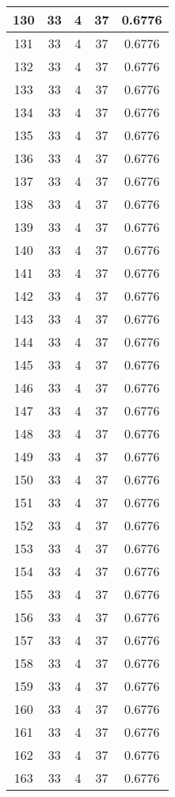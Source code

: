 \documentclass[letterpaper, 12pt]{article}
\begin{document}
\begin{longtable}{|c|c|c|c|c|}
\hline
130 & 33 & 4 & 37 & 0.6776 \\
\hline
131 & 33 & 4 & 37 & 0.6776 \\
\hline
132 & 33 & 4 & 37 & 0.6776 \\
\hline
133 & 33 & 4 & 37 & 0.6776 \\
\hline
134 & 33 & 4 & 37 & 0.6776 \\
\hline
135 & 33 & 4 & 37 & 0.6776 \\
\hline
136 & 33 & 4 & 37 & 0.6776 \\
\hline
137 & 33 & 4 & 37 & 0.6776 \\
\hline
138 & 33 & 4 & 37 & 0.6776 \\
\hline
139 & 33 & 4 & 37 & 0.6776 \\
\hline
140 & 33 & 4 & 37 & 0.6776 \\
\hline
141 & 33 & 4 & 37 & 0.6776 \\
\hline
142 & 33 & 4 & 37 & 0.6776 \\
\hline
143 & 33 & 4 & 37 & 0.6776 \\
\hline
144 & 33 & 4 & 37 & 0.6776 \\
\hline
145 & 33 & 4 & 37 & 0.6776 \\
\hline
146 & 33 & 4 & 37 & 0.6776 \\
\hline
147 & 33 & 4 & 37 & 0.6776 \\
\hline
148 & 33 & 4 & 37 & 0.6776 \\
\hline
149 & 33 & 4 & 37 & 0.6776 \\
\hline
150 & 33 & 4 & 37 & 0.6776 \\
\hline
151 & 33 & 4 & 37 & 0.6776 \\
\hline
152 & 33 & 4 & 37 & 0.6776 \\
\hline
153 & 33 & 4 & 37 & 0.6776 \\
\hline
154 & 33 & 4 & 37 & 0.6776 \\
\hline
155 & 33 & 4 & 37 & 0.6776 \\
\hline
156 & 33 & 4 & 37 & 0.6776 \\
\hline
157 & 33 & 4 & 37 & 0.6776 \\
\hline
158 & 33 & 4 & 37 & 0.6776 \\
\hline
159 & 33 & 4 & 37 & 0.6776 \\
\hline
160 & 33 & 4 & 37 & 0.6776 \\
\hline
161 & 33 & 4 & 37 & 0.6776 \\
\hline
162 & 33 & 4 & 37 & 0.6776 \\
\hline
163 & 33 & 4 & 37 & 0.6776 \\

\end{longtable}
\end{document}
